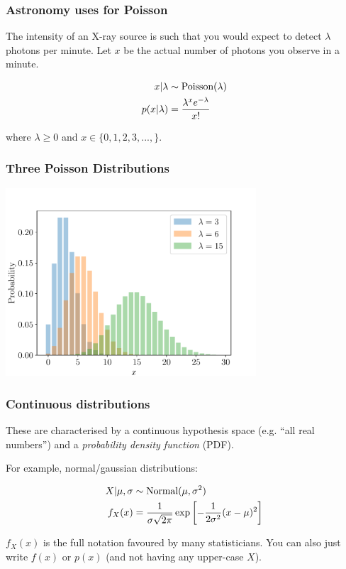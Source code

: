 \documentclass{beamer}
\begin{document}
\begin{frame}[t, fragile]
\frametitle{Astronomy uses for Poisson}


The intensity of an X-ray source is such that you would expect to detect
$\lambda$ photons per minute. Let $x$ be the actual number of photons you
observe in a minute.

\begin{align}
x | \lambda &\sim \textnormal{Poisson}(\lambda) \\
p(x | \lambda) &= \frac{\lambda^x e^{-\lambda}}{x!}
\end{align}

where $\lambda \geq 0$ and $x \in \{0, 1, 2, 3, ..., \}$.


\end{frame}


\begin{frame}[t, fragile]
\frametitle{Three Poisson Distributions}

\begin{center}
  \includegraphics[width=0.7\textwidth]{poisson.pdf}
\end{center}

\end{frame}


\begin{frame}[t, fragile]
\frametitle{Continuous distributions}

These are characterised by a continuous hypothesis space (e.g.
``all real numbers'') and a {\em probability density function} (PDF).
\vspace{1em}

For example, normal/gaussian distributions:

\begin{align}
X | \mu, \sigma &\sim \textnormal{Normal}(\mu, \sigma^2) \\
f_X(x) &= \frac{1}{\sigma \sqrt{2\pi}} \exp\left[-\frac{1}{2\sigma^2}(x-\mu)^2\right]
\end{align}

$f_X(x)$ is the full notation favoured by many statisticians.
You can also just write $f(x)$ or $p(x)$ (and not having any upper-case $X$).

\end{frame}
\end{document}
